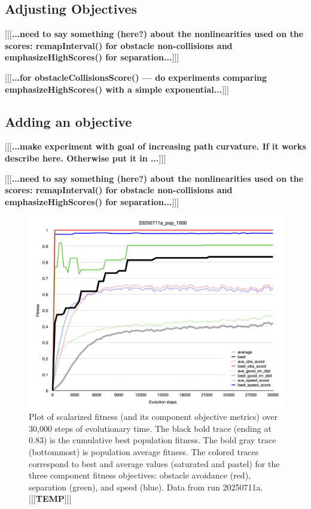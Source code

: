 \documentclass[letterpaper]{article}
\begin{document}
\subsection{Adjusting Objectives}
\label{subsec:adjust_objective}

[[[\textbf{...need to say something (here?) about the nonlinearities used on the scores: remapInterval() for obstacle non-collisions and emphasizeHighScores() for separation...}]]]

[[[\textbf{...for obstacleCollisionsScore() --- do experiments comparing emphasizeHighScores() with a simple exponential...}]]]

\subsection{Adding an objective}
\label{subsec:add_objective}

[[[\textbf{...make experiment with goal of increasing path curvature. If it works describe here. Otherwise put it in ...}]]]

[[[\textbf{...need to say something (here?) about the nonlinearities used on the scores: remapInterval() for obstacle non-collisions and emphasizeHighScores() for separation...}]]]


\begin{figure}[t]
    \centering
    \includegraphics[width=\linewidth]{images/temp_fit_plot.png}
    \caption{Plot of scalarized fitness (and its component objective metrics) over 30,000 steps of evolutionary time. The black bold trace (ending at 0.83) is the cumulative best population fitness. The bold gray trace (bottommost) is population average fitness. The colored traces correspond to best and average values (saturated and pastel) for the three component fitness objectives: obstacle avoidance (red), separation (green), and speed (blue). Data from run 20250711a. [[[\textbf{TEMP}]]]}
    \label{fig:fit_plot}
\end{figure}
\end{document}
